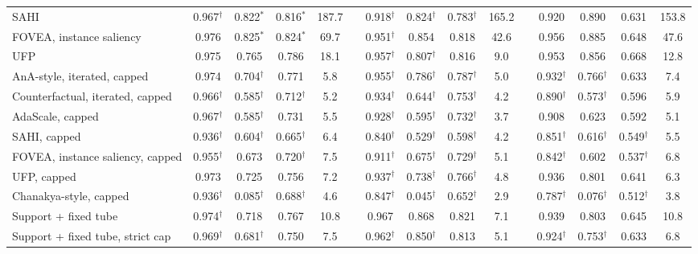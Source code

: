 \documentclass[10pt,letterpaper]{article}
\theoremstyle{remark}
\theoremstyle{plain}
\theoremstyle{definition}
\begin{document}
\begin{table}[!htbp]
\begin{tabular}{@{}lcccccccccccccc@{}}
SAHI & 0.967$^{\dagger}$ & 0.822$^{*}$ & 0.816$^{*}$ & 187.7 &  & 0.918$^{\dagger}$ & 0.824$^{\dagger}$ & 0.783$^{\dagger}$ & 165.2 &  & 0.920 & 0.890 & 0.631 & 153.8 \\
FOVEA, instance saliency & 0.976 & 0.825$^{*}$ & 0.824$^{*}$ & 69.7 &  & 0.951$^{\dagger}$ & 0.854 & 0.818 & 42.6 &  & 0.956 & 0.885 & 0.648 & 47.6 \\
UFP & 0.975 & 0.765 & 0.786 & 18.1 &  & 0.957$^{\dagger}$ & 0.807$^{\dagger}$ & 0.816 & 9.0 &  & 0.953 & 0.856 & 0.668 & 12.8 \\
\midrule
AnA-style, iterated, capped & 0.974 & 0.704$^{\dagger}$ & 0.771 & 5.8 &  & 0.955$^{\dagger}$ & 0.786$^{\dagger}$ & 0.787$^{\dagger}$ & 5.0 &  & 0.932$^{\dagger}$ & 0.766$^{\dagger}$ & 0.633 & 7.4 \\
Counterfactual, iterated, capped & 0.966$^{\dagger}$ & 0.585$^{\dagger}$ & 0.712$^{\dagger}$ & 5.2 &  & 0.934$^{\dagger}$ & 0.644$^{\dagger}$ & 0.753$^{\dagger}$ & 4.2 &  & 0.890$^{\dagger}$ & 0.573$^{\dagger}$ & 0.596 & 5.9 \\
AdaScale, capped & 0.967$^{\dagger}$ & 0.585$^{\dagger}$ & 0.731 & 5.5 &  & 0.928$^{\dagger}$ & 0.595$^{\dagger}$ & 0.732$^{\dagger}$ & 3.7 &  & 0.908 & 0.623 & 0.592 & 5.1 \\
SAHI, capped & 0.936$^{\dagger}$ & 0.604$^{\dagger}$ & 0.665$^{\dagger}$ & 6.4 &  & 0.840$^{\dagger}$ & 0.529$^{\dagger}$ & 0.598$^{\dagger}$ & 4.2 &  & 0.851$^{\dagger}$ & 0.616$^{\dagger}$ & 0.549$^{\dagger}$ & 5.5 \\
FOVEA, instance saliency, capped & 0.955$^{\dagger}$ & 0.673 & 0.720$^{\dagger}$ & 7.5 &  & 0.911$^{\dagger}$ & 0.675$^{\dagger}$ & 0.729$^{\dagger}$ & 5.1 &  & 0.842$^{\dagger}$ & 0.602 & 0.537$^{\dagger}$ & 6.8 \\
UFP, capped & 0.973 & 0.725 & 0.756 & 7.2 &  & 0.937$^{\dagger}$ & 0.738$^{\dagger}$ & 0.766$^{\dagger}$ & 4.8 &  & 0.936 & 0.801 & 0.641 & 6.3 \\
Chanakya-style, capped & 0.936$^{\dagger}$ & 0.085$^{\dagger}$ & 0.688$^{\dagger}$ & 4.6 &  & 0.847$^{\dagger}$ & 0.045$^{\dagger}$ & 0.652$^{\dagger}$ & 2.9 &  & 0.787$^{\dagger}$ & 0.076$^{\dagger}$ & 0.512$^{\dagger}$ & 3.8 \\
\midrule
Support + fixed tube & 0.974$^{\dagger}$ & 0.718 & 0.767 & 10.8 &  & 0.967 & 0.868 & 0.821 & 7.1 &  & 0.939 & 0.803 & 0.645 & 10.8 \\
Support + fixed tube, strict cap & 0.969$^{\dagger}$ & 0.681$^{\dagger}$ & 0.750 & 7.5 &  & 0.962$^{\dagger}$ & 0.850$^{\dagger}$ & 0.813 & 5.1 &  & 0.924$^{\dagger}$ & 0.753$^{\dagger}$ & 0.633 & 6.8 \\

\end{tabular}
\end{table}
\end{document}
